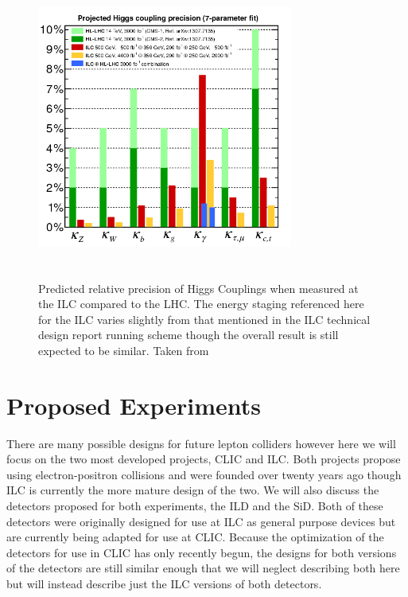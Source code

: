 \begin{figure}
  \centering
  \includegraphics[width=0.75\textwidth,height=10cm,keepaspectratio]{fig/LHCvsILC}
  \caption[Predicted Relative Coupling Precision For ILC vs LHC]{Predicted relative precision of Higgs Couplings when measured at the ILC compared to the LHC. The energy staging referenced here for the ILC varies slightly from that mentioned in the ILC technical design report \cite{ILCTDR} running scheme though the overall result is still expected to be similar. Taken from \cite{Fujii:2015jha}}
  \label{Fig:LHCvsILC}
\end{figure}

\chapter{Proposed Experiments}
There are many possible designs for future lepton colliders \cite{Lipton:2012du,Koratzinos:2014cla} however here we will focus on the two most developed projects, \ac{CLIC} and \ac{ILC}. Both projects propose using electron-positron collisions and were founded over twenty years ago though \ac{ILC} is currently the more mature design of the two. We will also discuss the detectors proposed for both experiments, the \ac{ILD} and the \ac{SiD}. Both of these detectors were originally designed for use at \ac{ILC} as general purpose devices but are currently being adapted for use at \ac{CLIC}. Because the optimization of the detectors for use in \ac{CLIC} has only recently begun, the designs for both versions of the detectors are still similar enough that we will neglect describing both here but will instead describe just the \ac{ILC} versions of both detectors.

